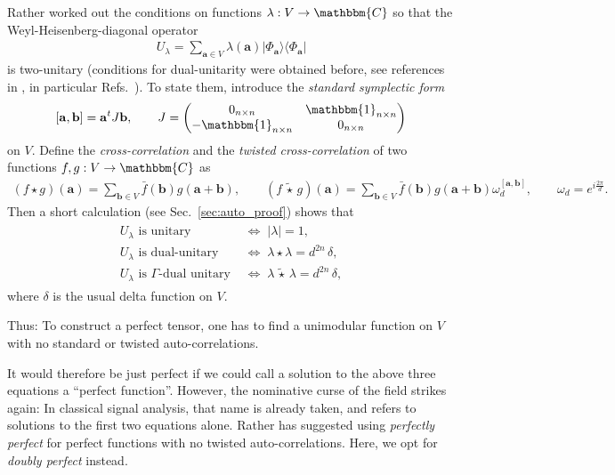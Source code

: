 \documentclass[aps,nofootinbib,floatfix,a4paper]{revtex4}
\newcommand{\1}{\mbox{$\mathbf{1}$}}
\def\CC{\mathbbm{C}}
\def\Id{\mathbbm{1}}
\newcommand{\twisted}{\,\tilde\star\,}
\renewcommand{\vec}{\mathbf}
\begin{document}
Rather worked out the conditions on functions $\lambda: V \to \CC$ so that the Weyl-Heisenberg-diagonal operator
\begin{align}\label{eqn:perfect_wh}
	U_\lambda
	=
	\sum_{\vec a\in V} \lambda(\vec a) |\Phi_{\vec a}\rangle\langle\Phi_{\vec a}|
\end{align}
is two-unitary
(conditions for dual-unitarity were obtained before, see references in \cite{Rather2024Construction}, in particular Refs.~\cite{tyson2003operator, Yu2024Hierarchical}).
To state them, introduce the \emph{standard symplectic form} 
\begin{align}\label{eqn:symplectic}
	[\vec a, \vec b] = \vec a^t J \vec b,
	\qquad
	J=
	\begin{pmatrix}
		0_{n\times n} & \Id_{n\times n} \\
		-\Id_{n\times n} & 0_{n\times n} 
	\end{pmatrix}
\end{align}
on $V$.
Define the \emph{cross-correlation} and the \emph{twisted cross-correlation} of two functions $f, g: V\to\CC$ as 
\begin{align}\label{eqn:correlation_functions}
			(f\star g)(\vec a) %
			=
		\sum_{\vec b\in V} %
			\bar f(\vec b) g(\vec a + \vec b),
			\qquad
			(f\twisted g)(\vec a)
			=
		\sum_{\vec b\in V} %
			\bar f(\vec b) g(\vec a + \vec b) \omega_d^{[\vec a, \vec b]},
			\qquad
			\omega_d=e^{i\frac{2\pi}d}.
\end{align}
Then a short calculation (see Sec.~\ref{sec:auto_proof}) shows that
\begin{align}\label{eqn:autocorr_conditions}
	\begin{split}
		U_\lambda\text{ is unitary } &\Leftrightarrow\; |\lambda|=1, \\
		U_\lambda\text{ is dual-unitary } &\Leftrightarrow\; \lambda\star\lambda = d^{2n} \, \delta, \\ 
		U_\lambda\text{ is $\Gamma$-dual unitary } &\Leftrightarrow\; \lambda\twisted\lambda = d^{2n} \, \delta,
	\end{split}
\end{align}
where $\delta$ is the usual delta function on $V$.

Thus:
To construct a perfect tensor, one has to find a unimodular function on $V$ with no standard or twisted auto-correlations.

It would therefore be just perfect if we could call a solution to the above three equations a ``perfect function''.
However, the nominative curse of the field strikes again:
In classical signal analysis, that name is already taken, and refers to solutions to the first two equations alone.
Rather has suggested using \emph{perfectly perfect} for perfect functions with no twisted auto-correlations.
Here, we opt for \emph{doubly perfect} instead.
\end{document}
